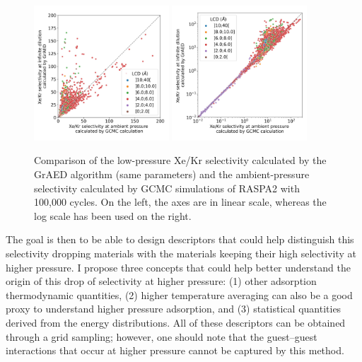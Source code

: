 \documentclass[main]{subfiles}
\begin{document}
\begin{figure}[ht]
  \centering
    \includegraphics[width=0.45\textwidth]{figures/3-fastsim/s_2080_vs_s_0_grid_overview.jpg}
    \includegraphics[width=0.45\textwidth]{figures/3-fastsim/s_2080_vs_s_0_grid_overview_log.jpg}
    \caption{Comparison of the low-pressure Xe/Kr selectivity calculated by the GrAED algorithm (same parameters) and the ambient-pressure selectivity calculated by GCMC simulations of RASPA2 with 100,000 cycles. On the left, the axes are in linear scale, whereas the log scale has been used on the right. }\label{fgr:grid_ambient_selectivity}
\end{figure}

The goal is then to be able to design descriptors that could help distinguish this selectivity dropping materials with the materials keeping their high selectivity at higher pressure. I propose three concepts that could help better understand the origin of this drop of selectivity at higher pressure: (1) other adsorption thermodynamic quantities, (2) higher temperature averaging can also be a good proxy to understand higher pressure adsorption, and (3) statistical quantities derived from the energy distributions. All of these descriptors can be obtained through a grid sampling; however, one should note that the guest--guest interactions that occur at higher pressure cannot be captured by this method.
\end{document}
